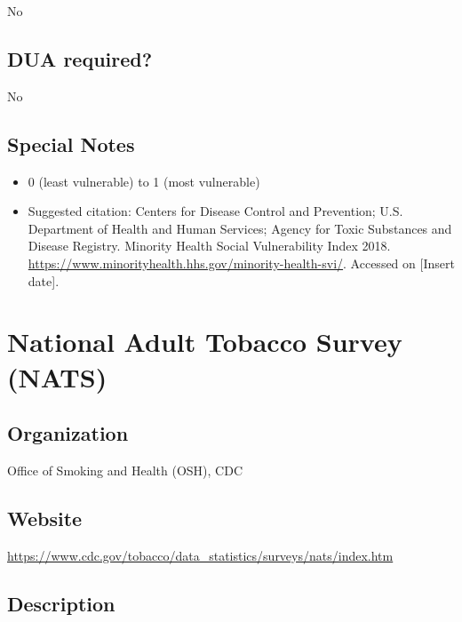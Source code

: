 \documentclass[
]{book}
\providecommand{\tightlist}{%
  \setlength{\itemsep}{0pt}\setlength{\parskip}{0pt}}
\begin{document}
No

\hypertarget{dua-required-40}{%
\section{DUA required?}\label{dua-required-40}}

No

\hypertarget{special-notes-40}{%
\section{Special Notes}\label{special-notes-40}}

\begin{itemize}
\tightlist
\item
  0 (least vulnerable) to 1 (most vulnerable)
\item
  Suggested citation: Centers for Disease Control and Prevention; U.S. Department of Health and Human Services; Agency for Toxic Substances and Disease Registry. Minority Health Social Vulnerability Index 2018. \url{https://www.minorityhealth.hhs.gov/minority-health-svi/}. Accessed on {[}Insert date{]}.
\end{itemize}

\mainmatter

\hypertarget{national-adult-tobacco-survey-nats}{%
\chapter{National Adult Tobacco Survey (NATS)}\label{national-adult-tobacco-survey-nats}}

\hypertarget{organization-41}{%
\section{Organization}\label{organization-41}}

Office of Smoking and Health (OSH), CDC

\hypertarget{website-41}{%
\section{Website}\label{website-41}}

\url{https://www.cdc.gov/tobacco/data_statistics/surveys/nats/index.htm}

\hypertarget{description-41}{%
\section{Description}\label{description-41}}
\end{document}
